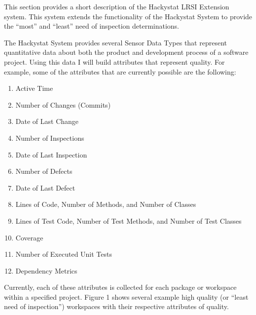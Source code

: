 
This section provides a short description of the Hackystat LRSI
Extension system. This system extends the functionality of the Hackystat
System to provide the ``most'' and ``least'' need of inspection determinations.

The Hackystat System provides several Sensor Data Types that represent
quantitative data about both the product and development process of a
software project. Using this data I will build attributes that represent
quality. For example, some of the attributes that are currently possible
are the following:

\begin{enumerate}
\item Active Time
\item Number of Changes (Commits)
\item Date of Last Change
\item Number of Inspections
\item Date of Last Inspection
\item Number of Defects
\item Date of Last Defect
\item Lines of Code, Number of Methods, and Number of Classes
\item Lines of Test Code, Number of Test Methods, and Number of Test
Classes
\item Coverage
\item Number of Executed Unit Tests
\item Dependency Metrics
\end{enumerate}

Currently, each of these attributes is collected for each package or
workspace within a specified project. Figure 1 shows several example high
quality (or ``least need of inspection'') workspaces with their respective
attributes of quality.

